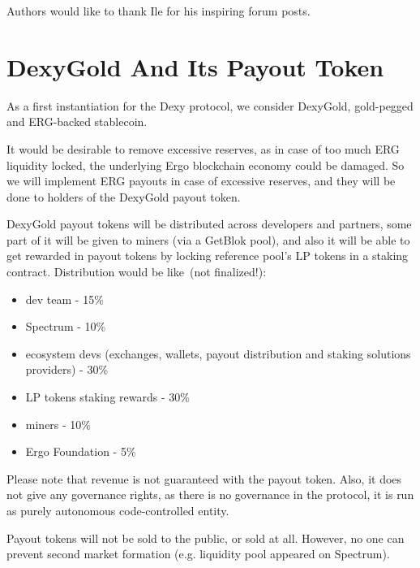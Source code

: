 \documentclass{article}   %
\begin{document}
Authors would like to thank Ile for his inspiring forum posts.

\section*{DexyGold And Its Payout Token}

As a first instantiation for the Dexy protocol, we consider DexyGold, gold-pegged and ERG-backed stablecoin. 

It would be desirable to remove excessive reserves, as in case of too much ERG liquidity locked, the underlying Ergo blockchain economy
could be damaged. So we will implement ERG payouts in case of excessive reserves, and they will be done to holders of the DexyGold payout token. 

DexyGold payout tokens will be distributed across developers and partners, some part of it will be given to miners (via a GetBlok pool), 
and also it will be able to get rewarded in payout tokens by locking reference pool's LP tokens in a staking contract.
Distribution would be like~(not finalized!):

\begin{itemize}
\item{dev team} - 15\%
\item{Spectrum} - 10\%
\item{ecosystem devs (exchanges, wallets, payout distribution and staking solutions providers)} - 30\%
\item{LP tokens staking rewards} - 30\%
\item{miners} - 10\%
\item{Ergo Foundation} - 5\%
\end{itemize}


Please note that revenue is not guaranteed with the payout token. Also, it does not give any governance rights, as there is no governance in the protocol, it is run as purely autonomous code-controlled entity. 

Payout tokens will not be sold to the public, or sold at all. However, no one can prevent second market formation (e.g. liquidity pool appeared on Spectrum).







%
\end{document}
